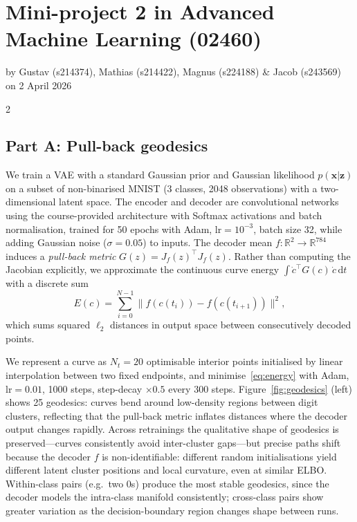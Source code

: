 \documentclass[10pt,a4paper]{article}
\begin{document}

\section*{Mini-project 2 in Advanced Machine Learning (02460)}
by Gustav (s214374), Mathias (s214422), Magnus (s224188) \& Jacob (s243569) on 2 April 2026

\setlength{\parindent}{0pt}
\setlength{\parskip}{2pt}

\begin{multicols}{2}
\subsection*{Part A: Pull-back geodesics}

We train a VAE with a standard Gaussian prior and Gaussian likelihood $p(\mathbf{x}|\mathbf{z})$ on a subset of non-binarised MNIST (3 classes, 2048 observations) with a two-dimensional latent space.
The encoder and decoder are convolutional networks using the course-provided architecture with Softmax activations and batch normalisation, trained for 50 epochs with Adam, lr${=}10^{-3}$, batch size 32, while adding Gaussian noise ($\sigma{=}0.05$) to inputs.
The decoder mean $f\colon\mathbb{R}^2 \to \mathbb{R}^{784}$ induces a \emph{pull-back metric} $G(z) = J_f(z)^\top J_f(z)$.
Rather than computing the Jacobian explicitly, we approximate the continuous curve energy $\int \dot{c}^\top G(c)\,\dot{c}\,\mathrm{d}t$ with a discrete sum
\begin{equation}\label{eq:energy}
  E(c) = \textstyle\sum_{i=0}^{N-1} \|f(c(t_i)) - f(c(t_{i+1}))\|^2,
\end{equation}
which sums squared $\ell_2$ distances in output space between consecutively decoded points.

We represent a curve as $N_t{=}20$ optimisable interior points initialised by linear interpolation between two fixed endpoints, and minimise~\eqref{eq:energy} with Adam, lr${=}0.01$, 1000 steps, step-decay ${\times}0.5$ every 300 steps.
Figure~\ref{fig:geodesics} (left) shows 25 geodesics: curves bend around low-density regions between digit clusters, reflecting that the pull-back metric inflates distances where the decoder output changes rapidly.
Across retrainings the qualitative shape of geodesics is preserved---curves consistently avoid inter-cluster gaps---but precise paths shift because the decoder $f$ is non-identifiable: different random initialisations yield different latent cluster positions and local curvature, even at similar ELBO.
Within-class pairs (e.g.\ two 0s) produce the most stable geodesics, since the decoder models the intra-class manifold consistently; cross-class pairs show greater variation as the decision-boundary region changes shape between runs.


\end{multicols}
\end{document}
